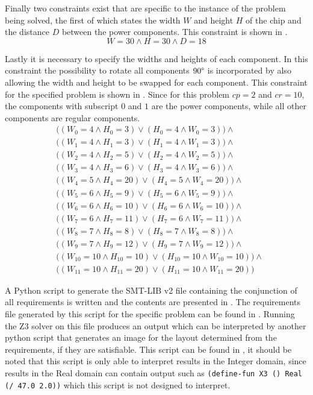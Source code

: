 Finally two constraints exist that are specific to the instance of the problem being solved, the first of which states the width $W$ and height $H$ of the chip and the distance $D$ between the power components. This constraint is shown in .
\begin{equation}
  \label{eqn:2_whd}
  W = 30 \wedge H = 30 \wedge D = 18
\end{equation}

Lastly it is necessary to specify the widths and heights of each component. In this constraint the possibility to rotate all components $90\degree$ is incorporated by also allowing the width and height to be swapped for each component. This constraint for the specified problem is shown in . Since for this problem $cp = 2$ and $cr = 10$, the components with subscript $0$ and $1$ are the power components, while all other components are regular components.
\newcommand{\IIsize}[3]{
  &\Big(
    (W_{#1} = #2 \wedge H_{#1} = #3) \vee
    (H_{#1} = #2 \wedge W_{#1} = #3)
  \Big)
}
\begin{equation}
  \label{eqn:2_sizes}
  \begin{aligned}
    \IIsize{0} {4} {3}  \wedge \\
    \IIsize{1} {4} {3}  \wedge \\
    \IIsize{2} {4} {5}  \wedge \\
    \IIsize{3} {4} {6}  \wedge \\
    \IIsize{4} {5} {20} \wedge \\
    \IIsize{5} {6} {9}  \wedge \\
    \IIsize{6} {6} {10} \wedge \\
    \IIsize{7} {6} {11} \wedge \\
    \IIsize{8} {7} {8}  \wedge \\
    \IIsize{9} {7} {12} \wedge \\
    \IIsize{10}{10}{10} \wedge \\
    \IIsize{11}{10}{20}
  \end{aligned}
\end{equation}

A Python script to generate the SMT-LIB v2 file containing the conjunction of all requirements is written and the contents are presented in . The requirements file generated by this script for the specific problem can be found in . Running the Z3 solver on this file produces an output which can be interpreted by another python script that generates an image for the layout determined from the requirements, if they are satisfiable. This script can be found in , it should be noted that this script is only able to interpret results in the Integer domain, since results in the Real domain can contain output such as \texttt{(define-fun X3 () Real (/ 47.0 2.0))} which this script is not designed to interpret.

